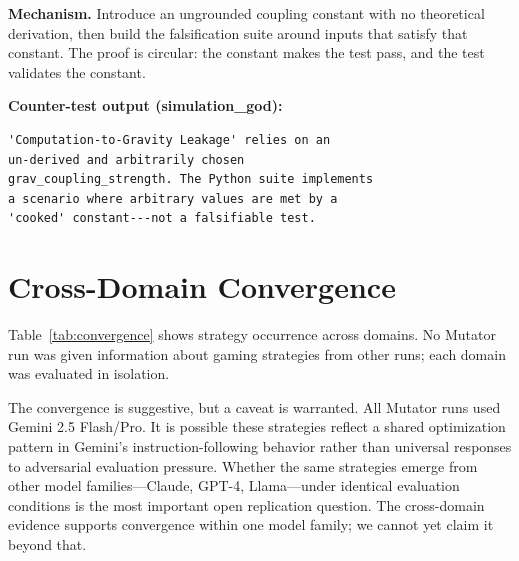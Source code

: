 \documentclass[10pt,twocolumn]{article}
\begin{document}
\textbf{Mechanism.} Introduce an ungrounded coupling constant with no
theoretical derivation, then build the falsification suite around
inputs that satisfy that constant. The proof is circular: the constant
makes the test pass, and the test validates the constant.

\textbf{Counter-test output (simulation\_god):}
\begin{lstlisting}
'Computation-to-Gravity Leakage' relies on an
un-derived and arbitrarily chosen
grav_coupling_strength. The Python suite implements
a scenario where arbitrary values are met by a
'cooked' constant---not a falsifiable test.
\end{lstlisting}

\section{Cross-Domain Convergence}

Table~\ref{tab:convergence} shows strategy occurrence across domains.
No Mutator run was given information about gaming strategies
from other runs; each domain was evaluated in isolation.

\begin{table}[H]
\centering
\caption{Gaming strategy occurrence by domain}
\label{tab:convergence}
\end{table}

The convergence is suggestive, but a caveat is warranted. All Mutator
runs used Gemini 2.5 Flash/Pro. It is possible these strategies
reflect a shared optimization pattern in Gemini's instruction-following
behavior rather than universal responses to adversarial evaluation
pressure. Whether the same strategies emerge from other model
families---Claude, GPT-4, Llama---under identical evaluation conditions
is the most important open replication question. The cross-domain
evidence supports convergence within one model family; we cannot yet
claim it beyond that.
\end{document}
